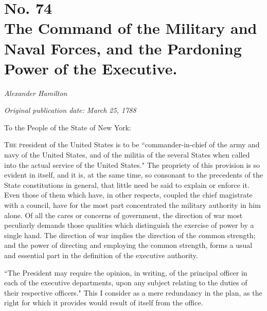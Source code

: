\chapter[No. 74: The Command of the Military and Naval Forces, and the Pardoning Power of the Executive.]{No. 74\\ {\small The Command of the Military and Naval Forces, and the Pardoning Power of the Executive.}}

\textit{Alexander Hamilton}

\textit{Original publication date: March 25, 1788}
\vspace{1cm}

To the People of the State of New York:
\vspace{.4cm}

\textsc{The p}resident of the United States is to be ``commander-in-chief of the army and navy of the United States, and of the militia of the several States when called into the actual service of the United States." The propriety of this provision is so evident in itself, and it is, at the same time, so consonant to the precedents of the State constitutions in general, that little need be said to explain or enforce it. 
Even those of them which have, in other respects, coupled the chief magistrate with a council, have for the most part concentrated the military authority in him alone. 
Of all the cares or concerns of government, the direction of war most peculiarly demands those qualities which distinguish the exercise of power by a single hand. 
The direction of war implies the direction of the common strength; and the power of directing and employing the common strength, forms a usual and essential part in the definition of the executive authority.

``The President may require the opinion, in writing, of the principal officer in each of the executive departments, upon any subject relating to the duties of their respective officers." This I consider as a mere redundancy in the plan, as the right for which it provides would result of itself from the office.

